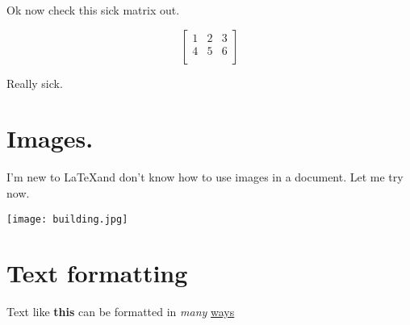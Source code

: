\documentclass{article}
\begin{document}
Ok now check this sick matrix out.

$$\begin{bmatrix}
1 & 2 & 3\\
4 & 5 & 6\\
\end{bmatrix}
$$

Really sick.

\section{Images.}

I'm new to \LaTeX and don't know how to use images in a document. Let me try now.

\smallskip
\begin{center}
\texttt{[image: building.jpg]}
\end{center}

\section{Text formatting}

Text like \textbf{this} can be formatted in \textit{many} \underline{ways}
\end{document}
